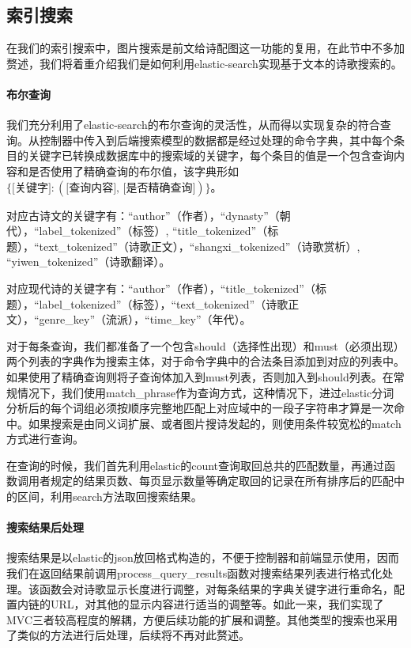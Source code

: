 \documentclass[a4paper, 10pt]{article}
\begin{document}
\subsection{索引搜索}

在我们的索引搜索中，图片搜索是前文给诗配图这一功能的复用，在此节中不多加赘述，我们将着重介绍我们是如何利用elastic-search实现基于文本的诗歌搜索的。

\paragraph*{布尔查询} 我们充分利用了elastic-search的布尔查询的灵活性，从而得以实现复杂的符合查询。从控制器中传入到后端搜索模型的数据都是经过处理的命令字典，其中每个条目的关键字已转换成数据库中的搜索域的关键字，每个条目的值是一个包含查询内容和是否使用了精确查询的布尔值，该字典形如$\{ \text{[关键字]}: (\text{[查询内容], [是否精确查询]}) \}$。

对应古诗文的关键字有：“author”（作者），“dynasty”（朝代），“label\_tokenized”（标签）, 
“title\_tokenized”（标题），“text\_tokenized”（诗歌正文），“shangxi\_tokenized”（诗歌赏析）, “yiwen\_tokenized”（诗歌翻译）。

对应现代诗的关键字有：“author”（作者），“title\_tokenized”（标题），“label\_tokenized”（标签），“text\_tokenized”（诗歌正文），“genre\_key”（流派），“time\_key”（年代）。

对于每条查询，我们都准备了一个包含should（选择性出现）和must（必须出现）两个列表的字典作为搜索主体，对于命令字典中的合法条目添加到对应的列表中。如果使用了精确查询则将子查询体加入到must列表，否则加入到should列表。在常规情况下，我们使用match\_phrase作为查询方式，这种情况下，进过elastic分词分析后的每个词组必须按顺序完整地匹配上对应域中的一段子字符串才算是一次命中。如果搜索是由同义词扩展、或者图片搜诗发起的，则使用条件较宽松的match方式进行查询。

在查询的时候，我们首先利用elastic的count查询取回总共的匹配数量，再通过函数调用者规定的结果页数、每页显示数量等确定取回的记录在所有排序后的匹配中的区间，利用search方法取回搜索结果。

\paragraph*{搜索结果后处理} 搜索结果是以elastic的json放回格式构造的，不便于控制器和前端显示使用，因而我们在返回结果前调用process\_query\_results函数对搜索结果列表进行格式化处理。该函数会对诗歌显示长度进行调整，对每条结果的字典关键字进行重命名，配置内链的URL，对其他的显示内容进行适当的调整等。如此一来，我们实现了MVC三者较高程度的解耦，方便后续功能的扩展和调整。其他类型的搜索也采用了类似的方法进行后处理，后续将不再对此赘述。
\end{document}
